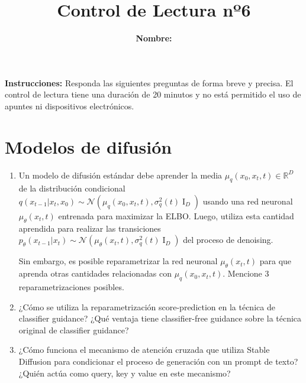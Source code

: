 \documentclass{article}
\title{\bfseries{Control de Lectura nº6}\vspace{0.5cm}}
\author{\textbf{Nombre:} \rule{12cm}{0.4pt}}
\newcommand{\R}{\mathbb{R}}
\begin{document}
\maketitle

\hspace{-0.5cm}\textbf{Instrucciones:} Responda las siguientes preguntas de forma breve y precisa. El control de lectura tiene una duración de 20 minutos y no está permitido el uso de apuntes ni dispositivos electrónicos.

\section*{Modelos de difusión}
\begin{enumerate}[{\bf P1.}]
	\item Un modelo de difusión estándar debe aprender la media $\mu_q(x_0,x_t,t)\in\R^D$ de la distribución condicional $q(x_{t-1}|x_t,x_0)\sim\mathcal{N}(\mu_q(x_0,x_t,t),\sigma_q^2(t)\operatorname{I}_D)$ usando una red neuronal $\mu_\theta(x_t,t)$ entrenada para maximizar la ELBO. Luego, utiliza esta cantidad aprendida para realizar las transiciones $p_\theta(x_{t-1}|x_t)\sim\mathcal{N}\left(\mu_\theta(x_t,t),\sigma_q^2(t)\operatorname{I}_D\right)$ del proceso de denoising.
	
	Sin embargo, es posible reparametrizar la red neuronal $\mu_\theta(x_t,t)$ para que aprenda otras cantidades relacionadas con $\mu_q(x_0,x_t,t)$. Mencione 3 reparametrizaciones posibles.

	\item ¿Cómo se utiliza la reparametrización score-prediction en la técnica de classifier guidance? ¿Qué ventaja tiene classifier-free guidance sobre la técnica original de classifier guidance?
	
	\item ¿Cómo funciona el mecanismo de atención cruzada que utiliza Stable Diffusion para condicionar el proceso de generación con un prompt de texto? ¿Quién actúa como query, key y value en este mecanismo?
\end{enumerate}
\end{document}

